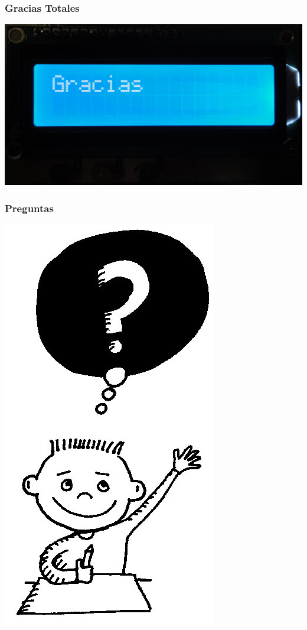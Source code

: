 \documentclass{beamer}
\begin{document}
\begin{frame}
	\frametitle{Gracias Totales}
	\begin{center}		
		\includegraphics[scale=.1]{Imagenes/grax.jpg}
	\end{center}
\end{frame}

\begin{frame}
	\frametitle{Preguntas}
	\begin{center}
		\bigskip		
		\includegraphics[scale=.25]{Imagenes/preguntas.jpg}
	\end{center}
\end{frame}
\end{document}
